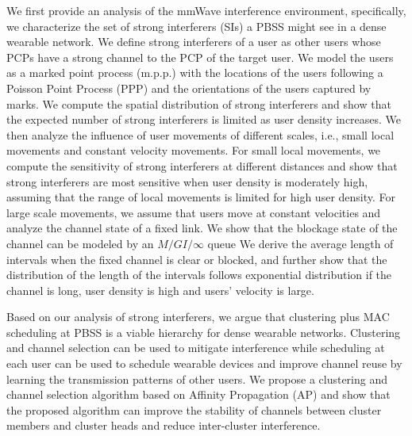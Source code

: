 \documentclass[10pt, conference, letterpaper]{IEEEtran}
\begin{document}
We first provide an analysis of the mmWave interference environment, specifically, we characterize the set of strong interferers (SIs) a PBSS might see in a dense wearable network. We define strong interferers of a user as other users whose PCPs have a strong channel to the PCP of the target user. We model the users as a marked point process (m.p.p.) with the locations of the users following a Poisson Point Process (PPP) and the orientations of the users captured by marks. We compute the spatial distribution of strong interferers and show that the expected number of strong interferers is limited as user density increases. 
We then analyze the influence of user movements of different scales, i.e., small local movements and constant velocity movements. For small local movements, we compute the sensitivity of strong interferers at different distances and show that strong interferers are most sensitive when user density is moderately high, assuming that the range of local movements is limited for high user density. For large scale movements, we assume that users move at constant velocities and analyze the channel state of a fixed link. We show that the blockage state of the channel can be modeled by an $M/GI/\infty$ queue We derive the average length of intervals when the fixed channel is clear or blocked, and further show that the distribution of the length of the intervals follows exponential distribution if the channel is long, user density is high and users' velocity is large.

Based on our analysis of strong interferers, we argue that clustering plus MAC scheduling at PBSS is a viable hierarchy for dense wearable networks. Clustering and channel selection can be used to mitigate interference while scheduling at each user can be used to schedule wearable devices and improve channel reuse by learning the transmission patterns of other users. We propose a clustering and channel selection algorithm based on Affinity Propagation (AP) and show that the proposed algorithm can improve the stability of channels between cluster members and cluster heads and reduce inter-cluster interference. 
\end{document}
